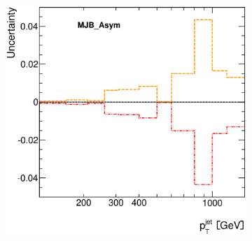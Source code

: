 \documentclass[12pt, twoside]{article}
\numberwithin{equation}{section}
\numberwithin{figure}{section}
\newenvironment{changemargin}[2]{%
\begin{list}{}{%
\setlength{\topsep}{0pt}%
\setlength{\leftmargin}{#1}%
\setlength{\rightmargin}{#2}%
\setlength{\listparindent}{\parindent}%
\setlength{\itemindent}{\parindent}%
\setlength{\parsep}{\parskip}%
}%
\item[]}{\end{list}}
\begin{document}
\begin{figure}[H]
\begin{changemargin}{-1.0cm}{-0.75cm}
\begin{changemargin}{-0.75cm}{-1.0cm}
\begin{subfigure}[b]{0.25\textwidth}
        \end{subfigure}
        \begin{subfigure}[b]{0.25\textwidth}
            \includegraphics[width=\textwidth]{./images/JetSystematics/JetSystematic-24.eps}
        \end{subfigure}


\end{changemargin}
\end{changemargin}
\end{figure}
\end{document}
